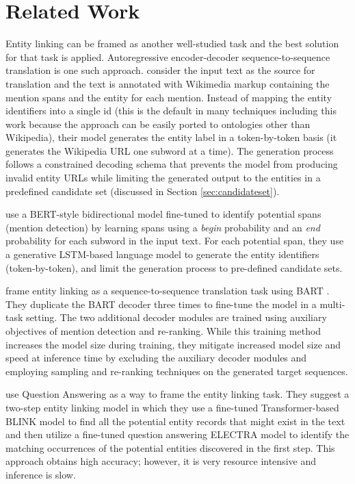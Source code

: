 \documentclass[11pt]{article}
\begin{document}
\vspace{-0.1cm}
\section{Related Work}\label{sec:lit_rev}

Entity linking can be framed as another well-studied task and the best solution for that task is applied. Autoregressive encoder-decoder sequence-to-sequence translation is one such approach. \citet{GENRE} consider the input text as the source for translation and the text is annotated with Wikimedia markup containing the mention spans and the entity for each mention. Instead of mapping the entity identifiers into a single id (this is the default in many techniques including this work because the approach can be easily ported to ontologies other than Wikipedia), their model generates the entity label in a token-by-token basis (it generates the Wikipedia URL one subword at a time). The generation process follows a constrained decoding schema that prevents the model from producing invalid entity URLs while limiting the generated output to the entities in a predefined candidate set (discussed in Section \ref{sec:candidateset}). 

\citet{2021.emnlp-main.604} use a BERT-style bidirectional model fine-tuned to identify potential spans (mention detection) by learning spans using a \textit{begin} probability and an \textit{end} probability for each subword in the input text. For each potential span, they use a generative LSTM-based \cite{LSTM} language model to generate the entity identifiers (token-by-token), and limit the generation process to pre-defined candidate sets. 

\citet{2022.findings-acl.156} frame entity linking as a sequence-to-sequence translation task using BART \cite{BART}. They duplicate the BART decoder three times to fine-tune the model in a multi-task setting. The two additional decoder modules are trained using auxiliary objectives of mention detection and re-ranking. While this training method increases the model size during training, they mitigate increased model size and speed at inference time by excluding the auxiliary decoder modules and employing sampling and re-ranking techniques on the generated target sequences.

\citet{EntQA} use Question Answering as a way to frame the entity linking task. They suggest a two-step entity linking model in which they use a fine-tuned Transformer-based BLINK \citep{2020.emnlp-main.519} model to find all the potential entity records that might exist in the text and then utilize a fine-tuned question answering ELECTRA \cite{ELECTRA} model to identify the matching occurrences of the potential entities discovered in the first step. This approach obtains high accuracy; however, it is very resource intensive and inference is slow.
\end{document}
